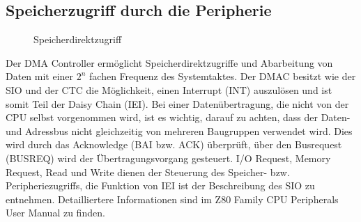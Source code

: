 \subsection{Speicherzugriff durch die Peripherie}
\begin{figure}[htb]
    \centering
    \qquad
    \qquad
    \caption[Z80 Speicherdirektzugriff]{Speicherdirektzugriff}
    \label{fig:z80-zeit}
\end{figure}
Der DMA Controller ermöglicht Speicherdirektzugriffe und Abarbeitung von Daten mit einer $2^n$ fachen Frequenz des Systemtaktes. Der DMAC besitzt wie der SIO und der CTC die Möglichkeit, einen Interrupt (INT) auszulösen und ist somit Teil der Daisy Chain (IEI). Bei einer Datenübertragung, die nicht von der CPU selbst vorgenommen wird, ist es wichtig, darauf zu achten, dass der Daten- und Adressbus nicht gleichzeitig von mehreren Baugruppen verwendet wird. Dies wird durch das Acknowledge (BAI bzw. ACK) überprüft, über den Busrequest (BUSREQ) wird der Übertragungsvorgang gesteuert. I/O Request, Memory Request, Read und Write dienen der Steuerung des Speicher- bzw. Peripheriezugriffs, die Funktion von IEI ist der Beschreibung des SIO zu entnehmen. Detailliertere Informationen sind im Z80 Family CPU Peripherals User Manual \cite{z80:periph} zu finden.

